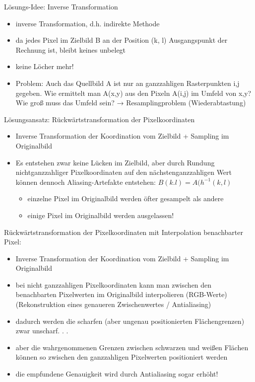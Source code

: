 \documentclass[10pt,landscape]{article}
\begin{document}
\begin{multicols}{3}
Lösungs-Idee: Inverse Transformation
\begin{itemize}
  \item inverse Transformation, d.h. indirekte Methode
  \item da jedes Pixel im Zielbild B an der Position (k, l) Ausgangspunkt der Rechnung ist, bleibt keines unbelegt
  \item keine Löcher mehr!
  \item Problem: Auch das Quellbild A ist nur an ganzzahligen Rasterpunkten i,j gegeben. Wie ermittelt man A(x,y) aus den Pixeln A(i,j) im Umfeld von x,y? Wie groß muss das Umfeld sein? → Resamplingproblem (Wiederabtastung)
\end{itemize}

Lösungsansatz: Rückwärtstransformation der Pixelkoordinaten
\begin{itemize}
\item Inverse Transformation der Koordination vom Zielbild + Sampling im Originalbild
\item Es entstehen zwar keine Lücken im Zielbild, aber durch Rundung nichtganzzahliger Pixelkoordinaten auf den nächstenganzzahligen Wert können dennoch Aliasing-Artefakte entstehen: $B(k.l)=A(h^{-1}(k,l)$
\begin{itemize}
  \item einzelne Pixel im Originalbild werden öfter gesampelt als andere
  \item einige Pixel im Originalbild werden ausgelassen!
\end{itemize}
\end{itemize}


Rückwärtstransformation der Pixelkoordinaten mit Interpolation benachbarter Pixel:
\begin{itemize}
  \item Inverse Transformation der Koordination vom Zielbild + Sampling im Originalbild
  \item bei nicht ganzzahligen Pixelkoordinaten kann man zwischen den benachbarten Pixelwerten im Originalbild interpolieren (RGB-Werte) (Rekonstruktion eines genaueren Zwischenwertes / Antialiasing)
  \item dadurch werden die scharfen (aber ungenau positionierten Flächengrenzen) zwar unscharf. . .
  \item aber die wahrgenommenen Grenzen zwischen schwarzen und weißen Flächen können so zwischen den ganzzahligen Pixelwerten positioniert werden
  \item die empfundene Genauigkeit wird durch Antialiasing sogar erhöht!
\end{itemize}


\end{multicols}
\end{document}

